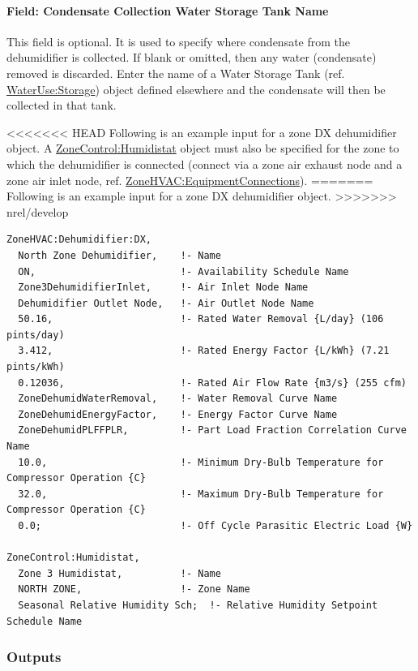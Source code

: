 \paragraph{Field: Condensate Collection Water Storage Tank Name}\label{field-condensate-collection-water-storage-tank-name-000}

This field is optional. It is used to specify where condensate from the dehumidifier is collected. If blank or omitted, then any water (condensate) removed is discarded. Enter the name of a Water Storage Tank (ref. \hyperref[waterusestorage]{WaterUse:Storage}) object defined elsewhere and the condensate will then be collected in that tank.

<<<<<<< HEAD
Following is an example input for a zone DX dehumidifier object. A \hyperref[zonecontrolhumidistat]{ZoneControl:Humidistat} object must also be specified for the zone to which the dehumidifier is connected (connect via a zone air exhaust node and a zone air inlet node, ref. \hyperref[zonehvacequipmentconnections]{ZoneHVAC:EquipmentConnections}).
=======
Following is an example input for a zone DX dehumidifier object.
>>>>>>> nrel/develop

\begin{lstlisting}
ZoneHVAC:Dehumidifier:DX,
  North Zone Dehumidifier,    !- Name
  ON,                         !- Availability Schedule Name
  Zone3DehumidifierInlet,     !- Air Inlet Node Name
  Dehumidifier Outlet Node,   !- Air Outlet Node Name
  50.16,                      !- Rated Water Removal {L/day} (106 pints/day)
  3.412,                      !- Rated Energy Factor {L/kWh} (7.21 pints/kWh)
  0.12036,                    !- Rated Air Flow Rate {m3/s} (255 cfm)
  ZoneDehumidWaterRemoval,    !- Water Removal Curve Name
  ZoneDehumidEnergyFactor,    !- Energy Factor Curve Name
  ZoneDehumidPLFFPLR,         !- Part Load Fraction Correlation Curve Name
  10.0,                       !- Minimum Dry-Bulb Temperature for Compressor Operation {C}
  32.0,                       !- Maximum Dry-Bulb Temperature for Compressor Operation {C}
  0.0;                        !- Off Cycle Parasitic Electric Load {W}

ZoneControl:Humidistat,
  Zone 3 Humidistat,          !- Name
  NORTH ZONE,                 !- Zone Name
  Seasonal Relative Humidity Sch;  !- Relative Humidity Setpoint Schedule Name
\end{lstlisting}

\subsubsection{Outputs}\label{outputs-10-008}

